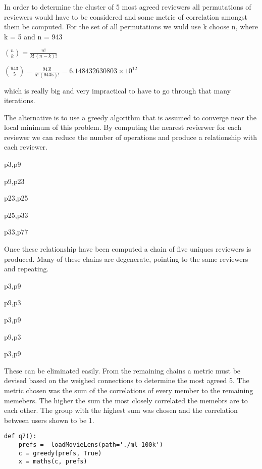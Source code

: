 \begin{flushleft}
In order to determine the cluster of 5 most agreed reviewers all permutations of reviewers would have to be considered and some metric of correlation amongst them be computed. For the set of all permutations we wuld use k choose n, where k = 5 and n = 943

\begin{center}
$ \binom nk = \frac{n!}{k!\,(n-k)!} $ 

${943 \choose 5}  =  \frac{943!}{5!\,(9435)!}  =  6.148432630803 × 10^{12}$
\end{center}

which is really big and very impractical to have to go through that many iterations. 

The alternative is to use a greedy algorithm that is assumed to converge near the local minimum of this problem. By computing the nearest revierwer for each reviewer we can reduce the number of operations and produce a relationship with each reviewer. 

\begin{center}
p3,p9 

p9,p23 

p23,p25 

p25,p33 

p33,p77 
\end{center}

Once these relationship have been computed a chain of five uniques reviewers is produced. Many of these chains are degenerate, pointing to the same reviewers and repeating. 

\begin{center}
p3,p9 

p9,p3

p3,p9 

p9,p3 

p3,p9 
\end{center}


These can be eliminated easily. From the remaining chains a metric must be devised based on the weighed connections to determine the most agreed 5. The metric chosen was the sum of the correlations of every member to the remaining memebers. The higher the sum the most closely correlated the memebrs are to each other. The group with the highest sum was chosen and the correlation between users shown to be 1. 





\begin{lstlisting}[caption={Python code for question 7}]
def q7():
    prefs =  loadMovieLens(path='./ml-100k')   
    c = greedy(prefs, True)
    x = maths(c, prefs)


\end{lstlisting}
\end{flushleft}
